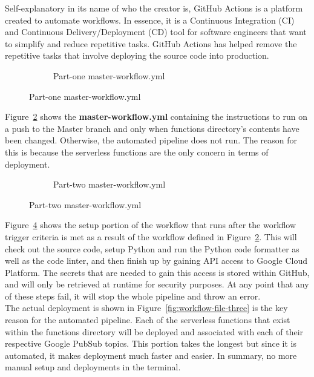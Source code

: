 \documentclass{article}
\begin{document}
Self-explanatory in its name of who the creator is, GitHub Actions is a platform created to automate workflows. In essence, it is a Continuous Integration (CI) and Continuous Delivery/Deployment (CD) tool for software engineers that want to simplify and reduce repetitive tasks. GitHub Actions has helped remove the repetitive tasks that involve deploying the source code into production.

\begin{figure}[H]
    \begin{figure}[H]
        
        \caption{Part-one master-workflow.yml}
        \label{fig:workflow-file-one}
    \end{figure}
\end{figure}

Figure~\ref{fig:workflow-file-one} shows the \textbf{master-workflow.yml} containing the instructions to run on a push to the Master branch and only when functions directory's contents have been changed. Otherwise, the automated pipeline does not run. The reason for this is because the serverless functions are the only concern in terms of deployment.

\begin{figure}[H]
    \begin{figure}[H]
        
        \caption{Part-two master-workflow.yml}
        \label{fig:workflow-file-two}
    \end{figure}
\end{figure}

Figure~\ref{fig:workflow-file-two} shows the setup portion of the workflow that runs after the workflow trigger criteria is met as a result of the workflow defined in Figure~\ref{fig:workflow-file-one}. This will check out the source code, setup Python and run the Python code formatter as well as the code linter, and then finish up by gaining API access to Google Cloud Platform. The secrets that are needed to gain this access is stored within GitHub, and will only be retrieved at runtime for security purposes. At any point that any of these steps fail, it will stop the whole pipeline and throw an error.\\

The actual deployment is shown in Figure~\ref{fig:workflow-file-three} is the key reason for the automated pipeline. Each of the serverless functions that exist within the functions directory will be deployed and associated with each of their respective Google PubSub topics. This portion takes the longest but since it is automated, it makes deployment much faster and easier. In summary, no more manual setup and deployments in the terminal.
\end{document}
